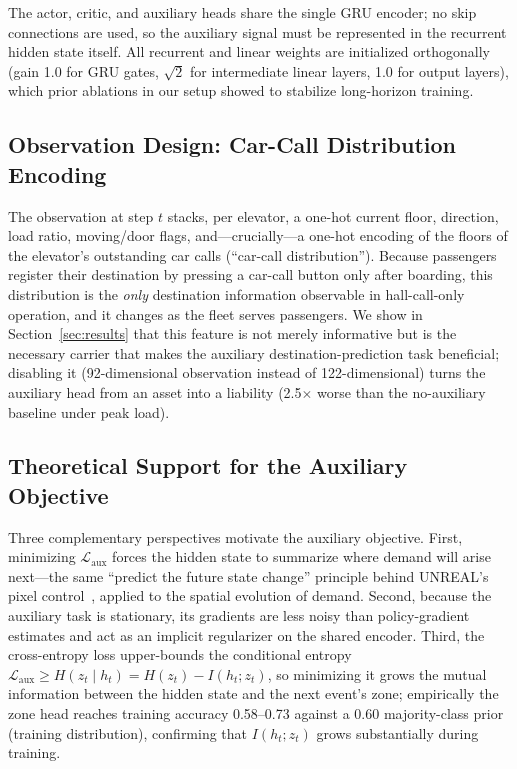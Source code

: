 \documentclass[conference]{IEEEtran}
\begin{document}
The actor, critic, and auxiliary heads share the single GRU encoder;
no skip connections are used, so the auxiliary signal must be
represented in the recurrent hidden state itself. All recurrent and
linear weights are initialized orthogonally (gain 1.0 for GRU gates,
$\sqrt{2}$ for intermediate linear layers, 1.0 for output layers),
which prior ablations in our setup showed to stabilize long-horizon
training.

\subsection{Observation Design: Car-Call Distribution Encoding}

The observation at step $t$ stacks, per elevator, a one-hot current
floor, direction, load ratio, moving/door flags, and---crucially---a
one-hot encoding of the floors of the elevator's outstanding car
calls (``car-call distribution''). Because passengers register their
destination by pressing a car-call button only after boarding, this
distribution is the \emph{only} destination information observable
in hall-call-only operation, and it changes as the fleet serves
passengers. We show in Section~\ref{sec:results} that this feature
is not merely informative but is the necessary carrier that makes
the auxiliary destination-prediction task beneficial; disabling it
(92-dimensional observation instead of 122-dimensional) turns the
auxiliary head from an asset into a liability (2.5$\times$ worse
than the no-auxiliary baseline under peak load).

\subsection{Theoretical Support for the Auxiliary Objective}

Three complementary perspectives motivate the auxiliary objective.
First, minimizing $\mathcal{L}_{\text{aux}}$ forces the hidden
state to summarize where demand will arise next---the same
``predict the future state change'' principle behind UNREAL's pixel
control~\cite{jaderberg2017unreal}, applied to the spatial
evolution of demand. Second, because the auxiliary task is
stationary, its gradients are less noisy than policy-gradient
estimates and act as an implicit regularizer on the shared encoder.
Third, the cross-entropy loss upper-bounds the conditional entropy
$\mathcal{L}_{\text{aux}} \geq H(z_t \mid h_t) = H(z_t) -
I(h_t; z_t)$, so minimizing it grows the mutual information between
the hidden state and the next event's zone; empirically the zone
head reaches training accuracy 0.58--0.73 against a 0.60
majority-class prior (training distribution), confirming that
$I(h_t; z_t)$ grows substantially during training.
\end{document}
